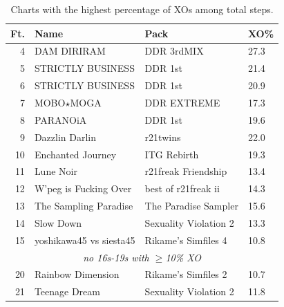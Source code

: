 \documentclass[10pt]{sigplanconf}
\begin{document}
\begin{table}[t]
	\begin{center}
		\small
	\begin{tabular}{r|l|l|l}
		\bf Ft. & \bf Name & \bf Pack & \bf XO\% \\
		\hline
		 4 & DAM DIRIRAM              & DDR 3rdMIX            & 27.3 \\
		 5 & STRICTLY BUSINESS        & DDR 1st               & 21.4 \\
		 6 & STRICTLY BUSINESS        & DDR 1st               & 20.9 \\
		 7 & MOBO$\star$MOGA          & DDR EXTREME           & 17.3 \\
		 8 & PARANOiA                 & DDR 1st               & 19.6 \\
		 9 & Dazzlin Darlin           & r21twins              & 22.0 \\
		10 & Enchanted Journey        & ITG Rebirth           & 19.3 \\
		11 & Lune Noir                & r21freak Friendship   & 13.4 \\
		12 & W'peg is Fucking Over    & best of r21freak ii   & 14.3 \\
		13 & The Sampling Paradise    & The Paradise Sampler  & 15.6 \\
		14 & Slow Down                & Sexuality Violation 2 & 13.3 \\
		15 & yoshikawa45 vs siesta45  & Rikame's Simfiles 4   & 10.8 \\
		\multicolumn{4}{c}{\em no 16s-19s with $\ge$10\% XO} \\
		20 & Rainbow Dimension        & Rikame's Simfiles 2   & 10.7 \\
		21 & Teenage Dream            & Sexuality Violation 2 & 11.8 \\
	\end{tabular}
	\end{center}
	\caption{Charts with the highest percentage of XOs among total steps.}
	\label{tab:chart-xop}
\end{table}
\end{document}
